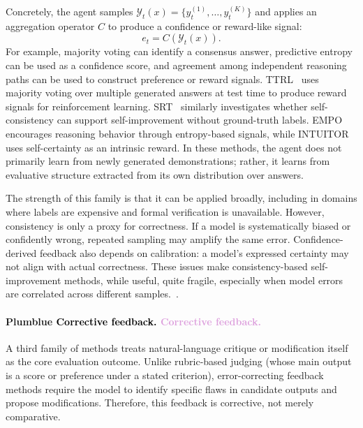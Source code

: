 \documentclass{article}
\let\oldtextcolor\textcolor
\renewcommand{\textcolor}[2]{
  \def\temp{#1}
  \def\red{blue}
  \ifx\temp\red
    \oldtextcolor{black}{#2}
  \else
    \oldtextcolor{#1}{#2}
  \fi
}
\begin{document}
Concretely, the agent samples $\mathcal{Y}_t(x)=\{y_t^{(1)},\ldots,y_t^{(K)}\}$ and applies an aggregation operator $C$ to produce a confidence or reward-like signal:
\begin{equation}
e_t=C(\mathcal{Y}_t(x)).
\end{equation}
For example, majority voting can identify a consensus answer, predictive entropy can be used as a confidence score, and agreement among independent reasoning paths can be used to construct preference or reward signals. TTRL~\citep{zuo2025ttrl} uses majority voting over multiple generated answers at test time to produce reward signals for reinforcement learning. SRT~\citep{shafayat2025can} similarly investigates whether self-consistency can support self-improvement without ground-truth labels. EMPO~\citep{zhang2025right} encourages reasoning behavior through entropy-based signals, while INTUITOR~\citep{zhao2025learning} uses self-certainty as an intrinsic reward. In these methods, the agent does not primarily learn from newly generated demonstrations; rather, it learns from evaluative structure extracted from its own distribution over answers.

The strength of this family is that it can be applied broadly, including in domains where labels are expensive and formal verification is unavailable. However, consistency is only a proxy for correctness. If a model is systematically biased or confidently wrong, repeated sampling may amplify the same error. Confidence-derived feedback also depends on calibration: a model's expressed certainty may not align with actual correctness. These issues make consistency-based self-improvement methods, while useful, quite fragile, especially when model errors are correlated across different samples.~\citep{tan-etal-2025-consistent, feng2025rethinkingllmuncertaintymultiagent, till2025teamingllmsdetectmitigate, anonymous2025complementing}.

\paragraph{\textcolor{Plum}{Corrective feedback.}}
A third family of methods treats natural-language critique or modification itself as the core evaluation outcome. Unlike rubric-based judging (whose main output is a score or preference under a stated criterion), error-correcting feedback methods require the model to identify specific flaws in candidate outputs and propose modifications. Therefore, this feedback is corrective, not merely comparative.
\end{document}
